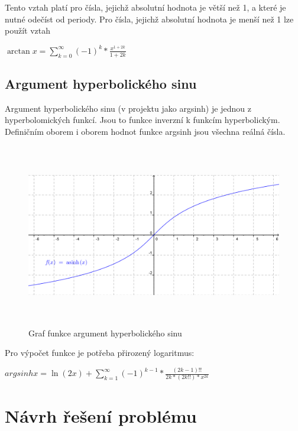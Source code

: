 \documentclass[12pt,a4paper,titlepage,final]{article}
\begin{document}
Tento vztah platí pro čísla, jejichž absolutní hodnota je větší než 1, a které
je nutné odečíst od periody. Pro čísla, jejichž absolutní hodnota je menší
než 1 lze použít vztah

\begin{center}
$ {\displaystyle \arctan x = \sum_{k=0}^{\infty} 
(-1)^k * \frac{x^{1+2k}}{1+2k}}$\end{center}

\subsection{Argument hyperbolického sinu}

Argument hyperbolického sinu (v projektu jako argsinh) je jednou z 
hyperbolomických funkcí. Jsou to funkce inverzní k funkcím hyperbolickým.
Definičním oborem i oborem hodnot funkce argsinh jsou všechna reálná čísla.

\begin{figure}[htbp]
  \centering
  \includegraphics[height=8cm]{img/asinush.png}
  \caption{Graf funkce argument hyperbolického sinu}
  \label{fig:asinush}
\end{figure}

Pro výpočet funkce je potřeba přirozený logaritmus:

\begin{center}
$ {\displaystyle argsinh x = \ln(2x) + \sum_{k=1}^{\infty}
(-1)^{k-1}* \frac{(2k-1)!!}{2k*(2k!!)*x^{2k}}}$\end{center}


\section{Návrh řešení problému} \label{navrh}
\end{document}
